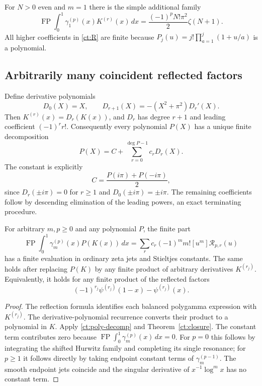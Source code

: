 For $N>0$ even and $m=1$ there is the simple additional family
\[
 \operatorname{FP}\int_0^1\gamma_1^{(p)}(x)K^{(r)}(x)\,dx
   =\frac{(-1)^pN!\pi^2}{2}\zeta(N+1).
\]
All higher coefficients in \eqref{ct:R} are finite because
$P_j(u)=j!\prod_{a=1}^j(1+u/a)$ is a polynomial.

\subsection{Arbitrarily many coincident reflected factors}

Define derivative polynomials
\[
 D_0(X)=X,\qquad D_{r+1}(X)=-(X^2+\pi^2)D_r'(X).
\]
Then $K^{(r)}(x)=D_r(K(x))$, and $D_r$ has degree $r+1$ and leading
coefficient $(-1)^rr!$. Consequently every polynomial $P(X)$ has a unique
finite decomposition
\begin{equation}\label{ct:poly-decomp}
 P(X)=C+\sum_{r=0}^{\deg P-1}c_rD_r(X).
\end{equation}
The constant is explicitly
\[
 C=\frac{P(i\pi)+P(-i\pi)}2,
\]
since $D_r(\pm i\pi)=0$ for $r\ge1$ and $D_0(\pm i\pi)=\pm i\pi$.
The remaining coefficients follow by descending elimination of the
leading powers, an exact terminating procedure.

\begin{corollary}
\label{ct:algebra}
For arbitrary $m,p\ge0$ and any polynomial $P$, the finite part
\[
 \operatorname{FP}\int_0^1\gamma_m^{(p)}(x)P(K(x))\,dx
 =\sum_r c_r(-1)^m m![u^m]\mathcal R_{p,r}(u)
\]
has a finite evaluation in ordinary zeta jets and Stieltjes constants.
The same holds after replacing
$P(K)$ by any finite product of arbitrary derivatives $K^{(r_j)}$.
Equivalently, it holds for any finite product of the reflected factors
\[
 (-1)^{r_j}\psi^{(r_j)}(1-x)-\psi^{(r_j)}(x).
\]
\end{corollary}
\begin{proof}
The reflection formula \cite[Eq.~5.15.6]{DLMFPolyGamma} identifies each balanced polygamma expression
with $K^{(r_j)}$. The derivative-polynomial recurrence converts their
product to a polynomial in $K$. Apply \eqref{ct:poly-decomp} and
Theorem~\ref{ct:closure}. The constant term contributes zero because
$\operatorname{FP}\int_0^1\gamma_m^{(p)}(x)\,dx=0$. For $p=0$ this
follows by integrating the shifted Hurwitz family and completing its
single resonance; for $p\ge1$ it follows directly by taking endpoint
constant terms of $\gamma_m^{(p-1)}$. The smooth endpoint jets coincide
and the singular derivative of $x^{-1}\log^m x$ has no constant term.
\end{proof}

